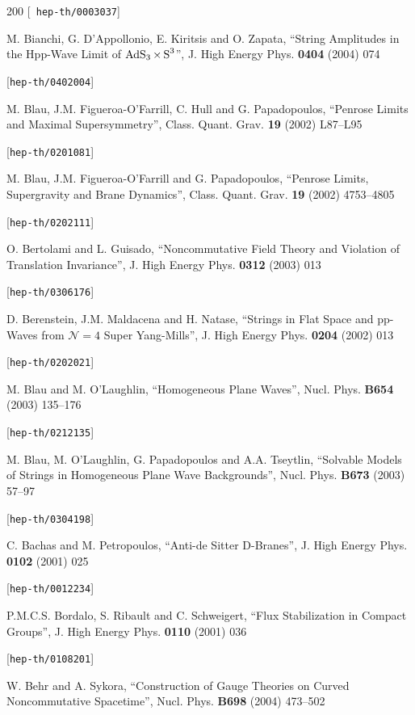 \begin{thebibliography}{200}
 [{\tt
    hep-th/0003037}]

 M. Bianchi, G. D'Appollonio, E. Kiritsis and O. Zapata, ``String
  Amplitudes in the Hpp-Wave Limit of $\operatorname{AdS}_3\times\operatorname{S}^3$'', J. High Energy Phys.
  {\bf 0404} (2004) 074 

 [{\tt hep-th/0402004}]

 M. Blau, J.M. Figueroa-O'Farrill, C. Hull and G. Papadopoulos,
  ``Penrose Limits and Maximal Supersymmetry'', Class. Quant. Grav. {\bf 19}
  (2002) L87--L95 

 [{\tt hep-th/0201081}]

 M. Blau, J.M. Figueroa-O'Farrill and G. Papadopoulos, ``Penrose
  Limits, Supergravity and Brane Dynamics'', Class. Quant. Grav. {\bf 19} (2002)
  4753--4805 

 [{\tt hep-th/0202111}]

 O. Bertolami and L. Guisado, ``Noncommutative Field Theory and Violation of Translation Invariance'', J. High Energy Phys. {\bf 0312} (2003) 013 

 [{\tt hep-th/0306176}] 

 D. Berenstein, J.M. Maldacena and H. Natase, ``Strings in Flat Space and pp-Waves from $\mathcal{N}=4$ Super Yang-Mills'', J. High Energy Phys. {\bf 0204} (2002) 013 

 [{\tt hep-th/0202021}] 

 M. Blau and M. O'Laughlin, ``Homogeneous Plane Waves'', Nucl. Phys. {\bf B654} (2003) 135--176 

 [{\tt hep-th/0212135}] 

 M. Blau, M. O'Laughlin, G. Papadopoulos and A.A. Tseytlin, ``Solvable Models of Strings in Homogeneous Plane Wave Backgrounds'', Nucl. Phys. {\bf B673} (2003) 57--97 

 [{\tt hep-th/0304198}] 

 C. Bachas and M. Petropoulos, ``Anti-de Sitter D-Branes'', J. High Energy Phys. {\bf 0102} (2001) 025 

 [{\tt hep-th/0012234}] 

 P.M.C.S. Bordalo, S. Ribault and C. Schweigert, ``Flux Stabilization in Compact Groups'', J. High Energy Phys. {\bf 0110} (2001) 036 

 [{\tt hep-th/0108201}] 

 W. Behr and A. Sykora, ``Construction of Gauge Theories on Curved Noncommutative Spacetime'', Nucl. Phys. {\bf B698} (2004) 473--502 


\end{thebibliography}
